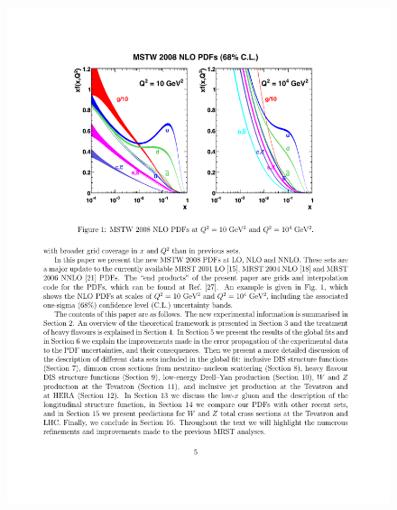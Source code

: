 \begin{figure}[h]
\centering
\includegraphics[width=1.0\textwidth]{fig/theory/mstw_pdfs.pdf}
\caption{\cite{bib:Martin:2009iq}}
\label{chap:theory:fig:pdf_set}
\end{figure}

